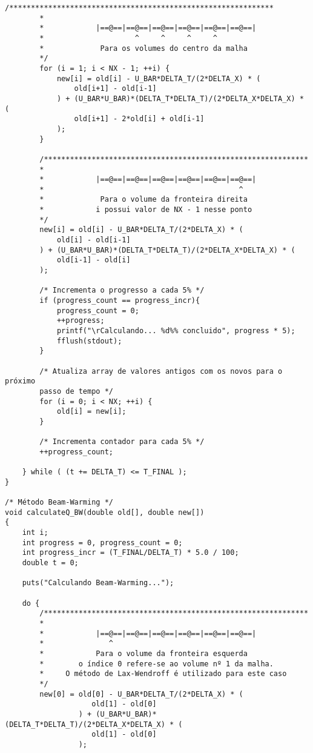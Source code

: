 \begin{Verbatim}[fontsize=\footnotesize]
        /*************************************************************
        *
        *            |==@==|==@==|==@==|==@==|==@==|==@==|
        *                     ^     ^     ^     ^
        *             Para os volumes do centro da malha
        */
        for (i = 1; i < NX - 1; ++i) {
            new[i] = old[i] - U_BAR*DELTA_T/(2*DELTA_X) * (
                old[i+1] - old[i-1]
            ) + (U_BAR*U_BAR)*(DELTA_T*DELTA_T)/(2*DELTA_X*DELTA_X) * (
                old[i+1] - 2*old[i] + old[i-1]
            );
        }

        /*************************************************************
        *
        *            |==@==|==@==|==@==|==@==|==@==|==@==|
        *                                             ^
        *             Para o volume da fronteira direita
        *            i possui valor de NX - 1 nesse ponto
        */
        new[i] = old[i] - U_BAR*DELTA_T/(2*DELTA_X) * (
            old[i] - old[i-1]
        ) + (U_BAR*U_BAR)*(DELTA_T*DELTA_T)/(2*DELTA_X*DELTA_X) * (
            old[i-1] - old[i]
        );

        /* Incrementa o progresso a cada 5% */
        if (progress_count == progress_incr){
            progress_count = 0;
            ++progress;
            printf("\rCalculando... %d%% concluido", progress * 5);
            fflush(stdout);
        }

        /* Atualiza array de valores antigos com os novos para o próximo
        passo de tempo */
        for (i = 0; i < NX; ++i) {
            old[i] = new[i];
        }

        /* Incrementa contador para cada 5% */
        ++progress_count;

    } while ( (t += DELTA_T) <= T_FINAL );
}

/* Método Beam-Warming */
void calculateQ_BW(double old[], double new[])
{
    int i;
    int progress = 0, progress_count = 0;
    int progress_incr = (T_FINAL/DELTA_T) * 5.0 / 100;
    double t = 0;

    puts("Calculando Beam-Warming...");

    do {
        /*************************************************************
        *
        *            |==@==|==@==|==@==|==@==|==@==|==@==|
        *               ^
        *            Para o volume da fronteira esquerda
        *        o índice 0 refere-se ao volume nº 1 da malha.
        *     O método de Lax-Wendroff é utilizado para este caso
        */
        new[0] = old[0] - U_BAR*DELTA_T/(2*DELTA_X) * (
                    old[1] - old[0]
                 ) + (U_BAR*U_BAR)*(DELTA_T*DELTA_T)/(2*DELTA_X*DELTA_X) * (
                    old[1] - old[0]
                 );


\end{Verbatim}
